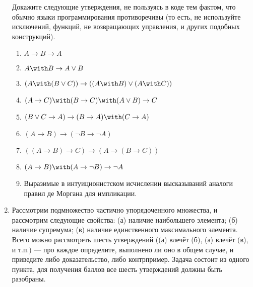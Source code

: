 \documentclass[10pt,a4paper,oneside]{article}
\begin{document}
\begin{enumerate}
Докажите следующие утверждения, не пользуясь в коде тем фактом, что обычно языки программирования
противоречивы (то есть, не используйте исключений, функций, не возвращающих управления, и других подобных конструкций).
\begin{enumerate}
\item $A \rightarrow B \rightarrow A$
\item $A \with B \rightarrow A \vee B$
\item $(A \with (B \vee C)) \rightarrow ((A \with B) \vee (A \with C))$
\item $(A \rightarrow C) \with (B \rightarrow C) \with (A \vee B) \rightarrow C$
\item $(B \vee C \rightarrow A) \rightarrow (B \rightarrow A) \with (C \rightarrow A)$
\item $(A \rightarrow B) \rightarrow (\neg B \rightarrow \neg A)$
\item $((A \rightarrow B) \rightarrow C) \rightarrow (A \rightarrow (B \rightarrow C))$
\item $(A \rightarrow B) \with (A \rightarrow \neg B) \rightarrow \neg A$
\item Выразимые в интуиционистском исчислении высказываний аналоги правил де Моргана для импликации.
\end{enumerate}

\item Рассмотрим подмножество частично упорядоченного множества, и рассмотрим следующие свойства:
(а) наличие наибольшего элемента; (б) наличие супремума;
(в) наличие единственного максимального элемента. Всего можно рассмотреть шесть утверждений ((а) влечёт (б), 
(а) влечёт (в), и т.п.) --- про каждое определите, выполнено ли оно в общем случае,
и приведите либо доказательство, либо контрпример. Задача состоит из одного пункта, для получения баллов 
все шесть утверждений должны быть разобраны.


\end{enumerate}
\end{document}
